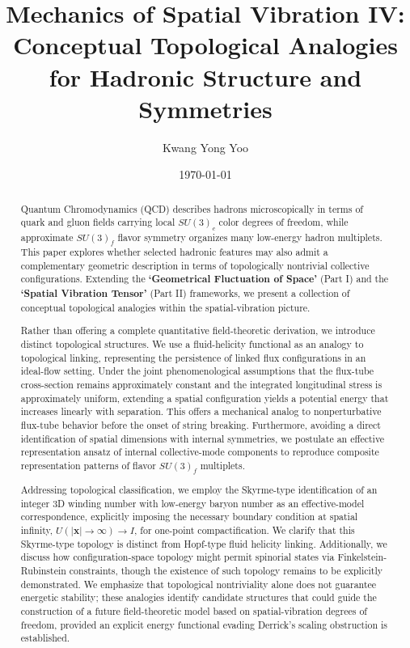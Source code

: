 \documentclass[reprint,amsmath,amssymb,aps,prd]{revtex4-2}
\begin{document}
\title{Mechanics of Spatial Vibration IV: Conceptual Topological Analogies for Hadronic Structure and Symmetries}

\author{Kwang Yong Yoo}

\date{\today}

\begin{abstract}
Quantum Chromodynamics (QCD) describes hadrons microscopically in terms of quark and gluon fields carrying local $SU(3)_c$ color degrees of freedom, while approximate $SU(3)_f$ flavor symmetry organizes many low-energy hadron multiplets. This paper explores whether selected hadronic features may also admit a complementary geometric description in terms of topologically nontrivial collective configurations. Extending the \textbf{`Geometrical Fluctuation of Space'} (Part I) and the \textbf{`Spatial Vibration Tensor'} (Part II) frameworks, we present a collection of conceptual topological analogies within the spatial-vibration picture.

Rather than offering a complete quantitative field-theoretic derivation, we introduce distinct topological structures. We use a fluid-helicity functional as an analogy to topological linking, representing the persistence of linked flux configurations in an ideal-flow setting. Under the joint phenomenological assumptions that the flux-tube cross-section remains approximately constant and the integrated longitudinal stress is approximately uniform, extending a spatial configuration yields a potential energy that increases linearly with separation. This offers a mechanical analog to nonperturbative flux-tube behavior before the onset of string breaking. Furthermore, avoiding a direct identification of spatial dimensions with internal symmetries, we postulate an effective representation ansatz of internal collective-mode components to reproduce composite representation patterns of flavor $SU(3)_f$ multiplets.

Addressing topological classification, we employ the Skyrme-type identification of an integer 3D winding number with low-energy baryon number as an effective-model correspondence, explicitly imposing the necessary boundary condition at spatial infinity, $U(|\mathbf{x}| \to \infty) \to I$, for one-point compactification. We clarify that this Skyrme-type topology is distinct from Hopf-type fluid helicity linking. Additionally, we discuss how configuration-space topology might permit spinorial states via Finkelstein-Rubinstein constraints, though the existence of such topology remains to be explicitly demonstrated. We emphasize that topological nontriviality alone does not guarantee energetic stability; these analogies identify candidate structures that could guide the construction of a future field-theoretic model based on spatial-vibration degrees of freedom, provided an explicit energy functional evading Derrick's scaling obstruction is established.
\end{abstract}
\end{document}
